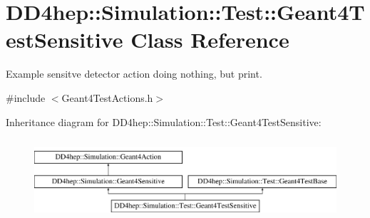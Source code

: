 \hypertarget{class_d_d4hep_1_1_simulation_1_1_test_1_1_geant4_test_sensitive}{}\section{D\+D4hep\+:\+:Simulation\+:\+:Test\+:\+:Geant4\+Test\+Sensitive Class Reference}
\label{class_d_d4hep_1_1_simulation_1_1_test_1_1_geant4_test_sensitive}


Example sensitve detector action doing nothing, but print.  




{\ttfamily \#include $<$Geant4\+Test\+Actions.\+h$>$}

Inheritance diagram for D\+D4hep\+:\+:Simulation\+:\+:Test\+:\+:Geant4\+Test\+Sensitive\+:\begin{figure}[H]
\begin{center}
\leavevmode
\includegraphics[height=3.000000cm]{class_d_d4hep_1_1_simulation_1_1_test_1_1_geant4_test_sensitive}
\end{center}
\end{figure}
